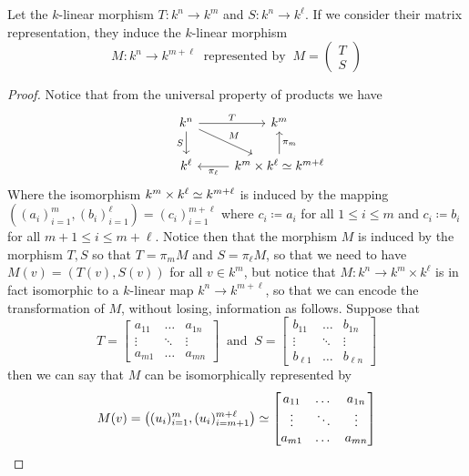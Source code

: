 \begin{proposition}
Let the \(k\)-linear morphism \(T : k^n \to k^m\) and \(S:k^n \to k^\ell\).
If we consider their matrix representation, they induce the \(k\)-linear
morphism
\[
  M : k^n \to k^{m+\ell}\ \text{ represented by }\
  M = \begin{pmatrix} T \\ S \end{pmatrix}
\]
\end{proposition}

\begin{proof}
Notice that from the universal property of products we have
\[
\begin{tikzcd}
    &k^n \ar["T", r] \ar["M", dr] \ar[swap, "S", d] &k^m \\
    &k^\ell &k^m \times k^\ell \iso k^{m+\ell} \ar["\pi_\ell", l]
    \ar[swap, "\pi_m", u]
\end{tikzcd}
\]
Where the isomorphism \(k^m \times k^\ell \simeq k^{m+\ell}\) is induced by the
mapping  \(((a_i)_{i=1}^m, (b_i)_{i=1}^\ell) = (c_i)_{i=1}^{m+\ell}\) where
\(c_i \coloneq a_i\) for all \(1 \leq i \leq m\) and \(c_i \coloneq b_i\) for all  \(m+1
\leq i \leq m+\ell\). Notice then that the morphism \(M\) is induced by the
morphism \(T, S\) so that \(T = \pi_m  M\) and \(S = \pi_\ell  M\),
so that we need to have \(M(v) = (T(v), S(v))\) for all \(v \in k^m\), but
notice that \(M : k^n \to k^m\times k^\ell\) is in fact isomorphic to a
\(k\)-linear map \(k^n \to k^{m+\ell}\), so that we can encode the
transformation of \(M\), without losing, information as follows. Suppose that
\[
T =
\begin{bmatrix}
  a_{11} &\dots &a_{1n} \\
  \vdots &\ddots &\vdots \\
  a_{m1} &\dots & a_{mn}
\end{bmatrix}
\ \text{ and }\
S =
\begin{bmatrix}
  b_{11} &\dots &b_{1n} \\
  \vdots &\ddots &\vdots \\
  b_{\ell 1} &\dots & b_{\ell n}
\end{bmatrix}
\]
then we can say that \(M\) can be isomorphically represented by
\[
M(v) = \left((u_i)_{i=1}^m, (u_i)_{i=m+1}^{m+\ell} \right) \simeq
\begin{bmatrix}
  a_{11} &\dots &a_{1n} \\
  \vdots &\ddots &\vdots \\
  a_{m1} &\dots & a_{mn} \\

\end{bmatrix}\]
\end{proof}
